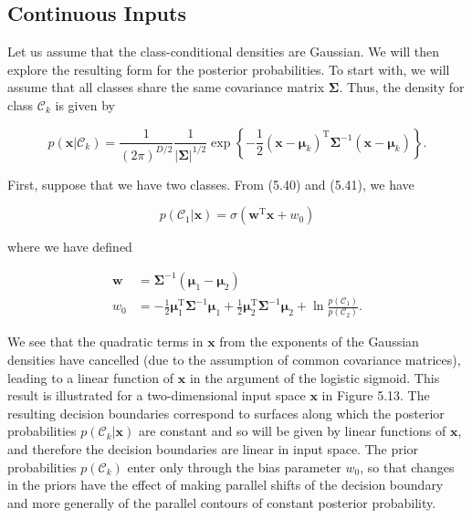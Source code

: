 \documentclass{article}
\begin{document}
\subsection{Continuous Inputs}

Let us assume that the class-conditional densities are Gaussian. We will then explore the resulting form for the posterior probabilities. To start with, we will assume that all classes share the same covariance matrix $\boldsymbol{\Sigma}$. Thus, the density for class $\mathcal{C}_{k}$ is given by

\begin{equation}
p(\mathbf{x}|\mathcal{C}_{k})=\frac{1}{(2\pi)^{D/2}}\frac{1}{|\boldsymbol{\Sigma}|^{1/2}}\exp\left\{-\frac{1}{2}(\mathbf{x}-\boldsymbol{\mu}_{k})^{\mathrm{T}}\boldsymbol{\Sigma}^{-1}(\mathbf{x}-\boldsymbol{\mu}_{k})\right\}.
\tag{5.47}
\end{equation}

First, suppose that we have two classes. From (5.40) and (5.41), we have

\begin{equation}
p(\mathcal{C}_{1}|\mathbf{x})=\sigma(\mathbf{w}^{\mathrm{T}}\mathbf{x}+w_{0})
\tag{5.48}
\end{equation}

where we have defined

\begin{align}
\mathbf{w} &= \boldsymbol{\Sigma}^{-1}(\boldsymbol{\mu}_{1}-\boldsymbol{\mu}_{2}) \tag{5.49}\\ 
w_{0} &= -\frac{1}{2}\boldsymbol{\mu}_{1}^{\mathrm{T}}\boldsymbol{\Sigma}^{-1}\boldsymbol{\mu}_{1}+\frac{1}{2}\boldsymbol{\mu}_{2}^{\mathrm{T}}\boldsymbol{\Sigma}^{-1}\boldsymbol{\mu}_{2}+\ln\frac{p(\mathcal{C}_{1})}{p(\mathcal{C}_{2})}. \tag{5.50}
\end{align}

We see that the quadratic terms in $\mathbf{x}$ from the exponents of the Gaussian densities have cancelled (due to the assumption of common covariance matrices), leading to a linear function of $\mathbf{x}$ in the argument of the logistic sigmoid. This result is illustrated for a two-dimensional input space $\mathbf{x}$ in Figure 5.13. The resulting decision boundaries correspond to surfaces along which the posterior probabilities $p(\mathcal{C}_{k}|\mathbf{x})$ are constant and so will be given by linear functions of $\mathbf{x}$, and therefore the decision boundaries are linear in input space. The prior probabilities $p(\mathcal{C}_{k})$ enter only through the bias parameter $w_{0}$, so that changes in the priors have the effect of making parallel shifts of the decision boundary and more generally of the parallel contours of constant posterior probability.
\end{document}
